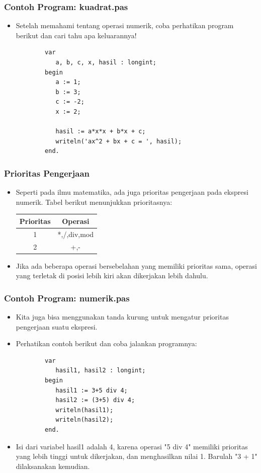 \documentclass{beamer}
\begin{document}
\begin{frame}[fragile]
\frametitle{Contoh Program: kuadrat.pas}
\begin{itemize}
    \item Setelah memahami tentang operasi numerik, coba perhatikan program berikut dan cari tahu apa keluarannya!
    \begin{lstlisting}
        var
           a, b, c, x, hasil : longint;
        begin
           a := 1;
           b := 3;
           c := -2;
           x := 2;

           hasil := a*x*x + b*x + c;
           writeln('ax^2 + bx + c = ', hasil);
        end.
    \end{lstlisting}
\end{itemize}
\end{frame}

\begin{frame}
\frametitle{Prioritas Pengerjaan}
\begin{itemize}
    \item Seperti pada ilmu matematika, ada juga prioritas pengerjaan pada ekspresi numerik. Tabel berikut menunjukkan prioritasnya:

    \begin{tabular}{|c|c|}
    \hline Prioritas & Operasi \\
    \hline 1 & *,/,div,mod \\
    \hline 2 & +,- \\
    \hline
    \end{tabular}
    \item Jika ada beberapa operasi bersebelahan yang memiliki prioritas sama, operasi yang terletak di posisi lebih kiri akan dikerjakan lebih dahulu.
\end{itemize}
\end{frame}

\begin{frame}[fragile]
\frametitle{Contoh Program: numerik.pas}
\begin{itemize}
    \item Kita juga bisa menggunakan tanda kurung untuk mengatur prioritas pengerjaan suatu ekspresi.
    \item Perhatikan contoh berikut dan coba jalankan programnya:
    \begin{lstlisting}
        var
           hasil1, hasil2 : longint;
        begin
           hasil1 := 3+5 div 4;
           hasil2 := (3+5) div 4;
           writeln(hasil1);
           writeln(hasil2);
        end.
    \end{lstlisting}
    \item Isi dari variabel hasil1 adalah 4, karena operasi "5 div 4" memiliki prioritas yang lebih tinggi untuk dikerjakan, dan menghasilkan nilai 1. Barulah "3 + 1" dilaksanakan kemudian.
\end{itemize}
\end{frame}
\end{document}
